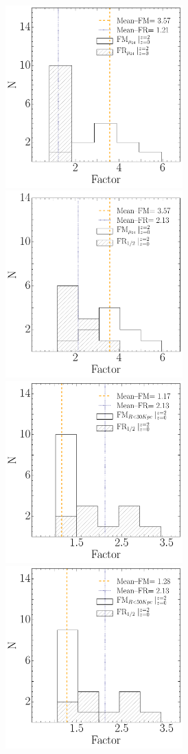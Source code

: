 \begin{figure}[H]
 \centering
 \includegraphics[height=7cm, width=7cm]{../al_final/LR/evolucion/histogramas/cocoientesmr24.pdf}
 \includegraphics[height=7.2cm, width=7cm]{../al_final/LR/evolucion/histogramas/cocoientesmr1medio.pdf}
 \\
 \includegraphics[height=7cm, width=7cm]{../al_final/LR/evolucion/histogramas/cocoientesm30r1medio}
 \includegraphics[height=7cm, width=7cm]{../al_final/LR/evolucion/histogramas/cocoientesm50r1medio}
\end{figure}


